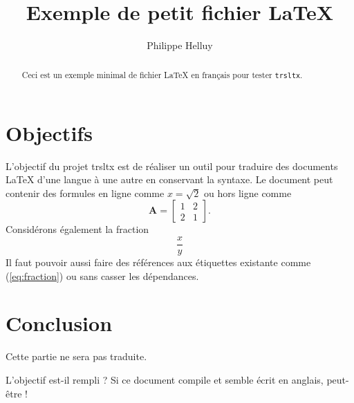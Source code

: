
\title{Exemple de petit fichier \LaTeX}
\author{Philippe Helluy}
\maketitle
\begin{abstract}
Ceci est un exemple minimal de fichier \LaTeX{} en français pour tester
\texttt{trsltx}.
\end{abstract}

\section{Objectifs}

L'objectif du projet trsltx est de réaliser un outil pour traduire
des documents \LaTeX{} d'une langue à une autre en conservant la syntaxe.
Le document peut contenir des formules en ligne comme $x=\sqrt{2}$
ou hors ligne comme
\begin{equation}
\mathbf{A}=\left[\begin{array}{cc}
1 & 2\\
2 & 1
\end{array}\right].\label{eq:matrice}
\end{equation}
Considérons également la fraction
\begin{equation}
\frac{x}{y} \label{eq:fraction}
\end{equation}
Il faut pouvoir aussi faire des références aux étiquettes existante
comme (\ref{eq:fraction}) ou  sans casser les dépendances.

\section{Conclusion}

Cette partie ne 
sera pas traduite.

L'objectif est-il rempli ? Si ce document compile et semble écrit
en anglais, peut-être !
